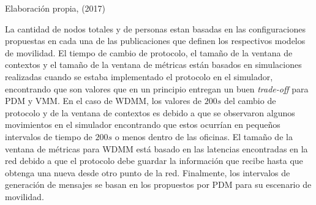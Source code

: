 {Elaboración propia, (2017)}


La cantidad de nodos totales y de personas estan basadas en las configuraciones
propuestas en cada una de las publicaciones que definen los respectivos modelos
de movilidad. El tiempo de cambio de protocolo, el tamaño de la ventana de
contextos y el tamaño de la ventana de métricas están basados en simulaciones
realizadas cuando se estaba implementado el protocolo en el simulador,
encontrando que son valores que en un principio entregan un buen
\textit{trade-off} para PDM y VMM. En el caso de WDMM, los valores de $200s$ del
cambio de protocolo y de la ventana de contextos es debido a que se observaron
algunos movimientos en el simulador encontrando que estos ocurrían en pequeños
intervalos de tiempo de $200s$ o menos dentro de las oficinas. El tamaño de la
ventana de métricas para WDMM está basado en las latencias encontradas en la red
debido a que el protocolo debe guardar la información que recibe hasta que
obtenga una nueva desde otro punto de la red. Finalmente, los intervalos de
generación de mensajes se basan en los propuestos por PDM para su escenario de
movilidad.



